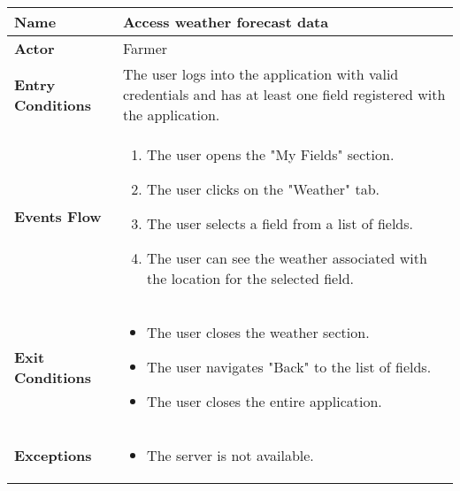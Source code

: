 \begin{center}
\renewcommand{\arraystretch}{1.25}
\begin{tabular}{|l|>{\raggedright\arraybackslash}m{12cm}|}
    \hline
    \textbf{Name} & Access weather forecast data\\
    \hline
   	\textbf{Actor} & Farmer\\
    \hline
    \textbf{Entry Conditions} & The user logs into the application with valid credentials and has at least one field registered with the application.\\
    \hline
    
    \textbf{Events Flow} & \begin{enumerate}
    			\item The user opens the "My Fields" section.
    			\item The user clicks on the "Weather" tab.
    			\item The user selects a field from a list of fields.
    			\item The user can see the weather associated with the location for the selected field.
	    		\end{enumerate}
    	\\
    \hline
    \textbf{Exit Conditions} & \begin{itemize}
    	\item The user closes the weather section.
    	\item The user navigates "Back" to the list of fields.
   		\item The user closes the entire application.
   		\end{itemize} \\
    \hline
    \textbf{Exceptions} &
    		\begin{itemize}
    			\item The server is not available.
    		\end{itemize}
    \\
    \hline
\end{tabular}
\end{center}